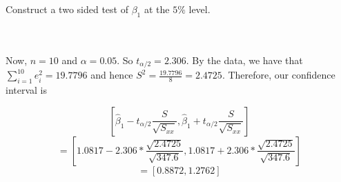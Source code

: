 Construct a two sided test of $\beta_1$ at the $5\%$ level.\\\\

\begin{solution}\renewcommand{\qedsymbol}{}\ \\
    Now, $n=10$ and $\alpha=0.05$. So $t_{\alpha/2}=2.306$. By the data, we have that
    $\sum_{i=1}^10e_i^2=19.7796$ and hence $S^2=\frac{19.7796}{8}=2.4725$. Therefore, our confidence
    interval is
    
    $$[\hat{\beta}_1-t_{\alpha/2}\frac{S}{\sqrt{S_{xx}}},
    \hat{\beta}_1+t_{\alpha/2}\frac{S}{\sqrt{S_{xx}}}]$$
    $$=[1.0817-2.306*\frac{\sqrt{2.4725}}{\sqrt{347.6}},
    1.0817+2.306*\frac{\sqrt{2.4725}}{\sqrt{347.6}}]$$
    $$=[0.8872, 1.2762]$$

\end{solution}